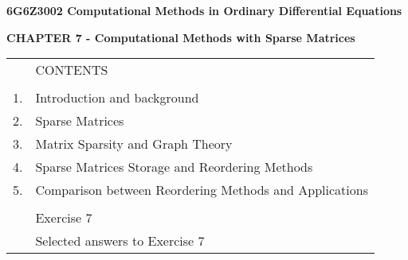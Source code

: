 \documentclass[a4paper,12pt]{article}
\begin{document}
\vspace*{3cm}
\begin{center}
    \textbf{6G6Z3002 Computational Methods in Ordinary Differential Equations}
\end{center}
\vspace{1cm}
\begin{center}
    \textbf{CHAPTER 7 - Computational Methods with Sparse Matrices}
\end{center}
\vspace{1.5cm}
\begingroup
    \renewcommand{\arraystretch}{1}
    \setlength{\tabcolsep}{4pt}
    \begin{tabular}{rl}
           & CONTENTS\\
        \hspace*{10ex} & \\
        1. & Introduction and background\\
        2. & Sparse Matrices\\
        3. & Matrix Sparsity and Graph Theory\\
        4. & Sparse Matrices Storage and Reordering Methods\\
        5. & Comparison between Reordering Methods and Applications\\
           &\\
           & Exercise 7\\
           & Selected answers to Exercise 7\\
    \end{tabular}
\endgroup
\end{document}
